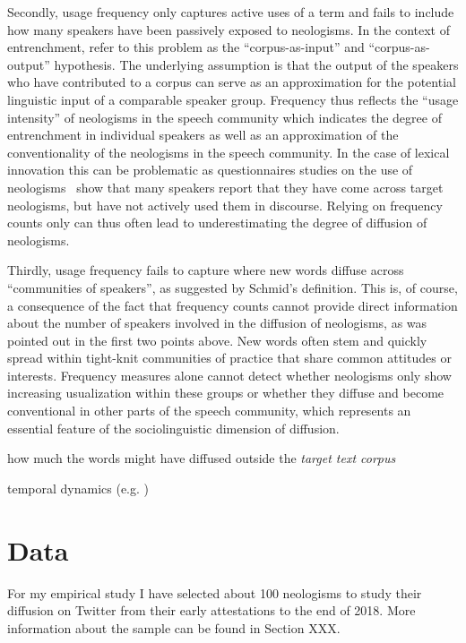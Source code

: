 \documentclass[a4paper, abstract=on]{scrartcl}
\begin{document}
    Secondly, usage frequency only captures active uses of a term and fails to include how many speakers have been passively exposed to neologisms. In the context of entrenchment, \textcite{Stefanowitsch2017} refer to this problem as the \enquote{corpus-as-input} and \enquote{corpus-as-output} hypothesis. The underlying assumption is that the output of the speakers who have contributed to a corpus can serve as an approximation for the potential linguistic input of a comparable speaker group. Frequency thus reflects the \enquote{usage intensity} of neologisms in the speech community which indicates the degree of entrenchment in individual speakers as well as an approximation of the conventionality of the neologisms in the speech community. In the case of lexical innovation this can be problematic as questionnaires studies on the use of neologisms~\parencite{Kerremans2015} show that many speakers report that they have come across target neologisms, but have not actively used them in discourse. Relying on frequency counts only can thus often lead to underestimating the degree of diffusion of neologisms.

    Thirdly, usage frequency fails to capture where new words diffuse across \enquote{communities of speakers}, as suggested by Schmid's definition. This is, of course, a consequence of the fact that frequency counts cannot provide direct information about the number of speakers involved in the diffusion of neologisms, as was pointed out in the first two points above. New words often stem and quickly spread within tight-knit communities of practice that share common attitudes or interests. Frequency measures alone cannot detect whether neologisms only show increasing usualization within these groups or whether they diffuse and become conventional in other parts of the speech community, which represents an essential feature of the sociolinguistic dimension of diffusion.


    how much the words might have diffused outside the \emph{target text corpus}

    temporal dynamics (e.g. )

\section{Data}

    For my empirical study I have selected about 100 neologisms to study their diffusion on Twitter from their early attestations to the end of 2018. More information about the sample can be found in Section XXX.
\end{document}
